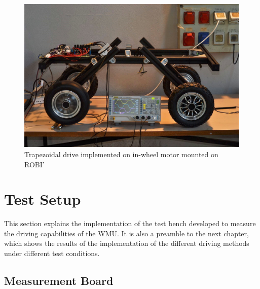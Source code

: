 \begin{figure}
    \includegraphics[width=\textwidth]{Images/pictures/pic4.png} 
    \caption[Trapezoidal drive implemented on in-wheel motor mounted on ROBI']{Trapezoidal drive implemented on in-wheel motor mounted on ROBI'}
    \label{fig:pic4}
\end{figure}


\clearpage
\section{Test Setup}

This section explains the implementation of the test bench developed to measure the driving capabilities of the \ac{WMU}. It is also a preamble to the next chapter, which shows the results of the implementation of the different driving methods under different test conditions.

\subsection{Measurement Board}

